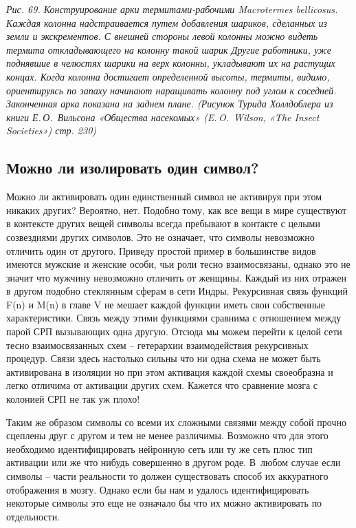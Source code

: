\documentclass[../main.tex]{subfiles}
\begin{document}
\emph{Рис. 69. Конструирование арки термитами-рабочими Macrotermes bellicosus. Каждая колонна надстраивается путем добавления шариков, сделанных из земли и экскрементов. С внешней стороны левой колонны можно видеть термита откладывающего на колонну такой шарик Другие работники, уже поднявшие в челюстях шарики на верх колонны, укладывают их на растущих концах. Когда колонна достигает определенной высоты, термиты, видимо, ориентируясь по запаху начинают наращивать колонну под углом к соседней. Законченная арка показана на заднем плане. (Рисунок Турида Холлдоблера из книги Е.\,О.~Вильсона «Общества насекомых» (E.\,O.~Wilson, «The Insect Societies») стр. 230)}


\subsection{Можно ли изолировать один символ?}

Можно ли активировать один единственный символ не активируя при этом никаких других? Вероятно, нет. Подобно тому, как все вещи в мире существуют в контексте других вещей символы всегда пребывают в контакте с целыми созвездиями других символов. Это не означает, что символы невозможно отличить один от другого. Приведу простой пример в большинстве видов имеются мужские и женские особи, чьи роли тесно взаимосвязаны, однако это не значит что мужчину невозможно отличить от женщины. Каждый из них отражен в другом подобно стеклянным сферам в сети Индры. Рекурсивная связь функций F(n) и M(n) в главе V не мешает каждой функции иметь свои собственные характеристики. Связь между этими функциями сравнима с отношением между парой СРП вызывающих одна другую. Отсюда мы можем перейти к целой сети тесно взаимосвязанных схем \--- гетерархии взаимодействия рекурсивных процедур. Связи здесь настолько сильны что ни одна схема не может быть активирована в изоляции но при этом активация каждой схемы своеобразна и легко отличима от активации других схем. Кажется что сравнение мозга с колонией СРП не так уж плохо!

Таким же образом символы со всеми их сложными связями между собой прочно сцеплены друг с другом и тем не менее различимы. Возможно что для этого необходимо идентифицировать нейронную сеть или ту же сеть плюс тип активации или же что нибудь совершенно в другом роде. В~любом случае если символы \--- части реальности то должен существовать способ их аккуратного отображения в мозгу. Однако если бы нам и удалось идентифицировать некоторые символы это еще не означало бы что их можно активировать по отдельности.
\end{document}
